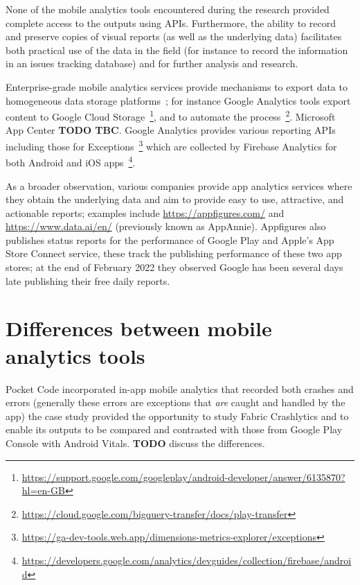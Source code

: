 None of the mobile analytics tools encountered during the research provided complete access to the outputs using APIs. Furthermore, the ability to record and preserve copies of visual reports (as well as the underlying data) facilitates both practical use of the data in the field (for instance to record the information in an issues tracking database) and for further analysis and research. 

Enterprise-grade mobile analytics services provide mechanisms to export data to homogeneous data storage platforms~\citep{androiddevelopers2015_integrate_play_data_into_your_workflow_with_data_exports}; for instance Google Analytics tools export content to Google Cloud Storage~\footnote{\url{https://support.google.com/googleplay/android-developer/answer/6135870?hl=en-GB}}, and to automate the process~\footnote{\url{https://cloud.google.com/bigquery-transfer/docs/play-transfer}}. Microsoft App Center \textbf{TODO TBC}. Google Analytics provides various reporting APIs including those for Exceptions~\footnote{\url{https://ga-dev-tools.web.app/dimensions-metrics-explorer/exceptions}} which are collected by Firebase Analytics for both Android and iOS apps~\footnote{\url{https://developers.google.com/analytics/devguides/collection/firebase/android}}. %

As a broader observation, various companies provide app analytics services where they obtain the underlying data %
and aim to provide easy to use, attractive, and actionable reports; examples include \url{https://appfigures.com/} and \url{https://www.data.ai/en/} (previously known as AppAnnie). Appfigures also publishes status reports for the performance of Google Play and Apple's App Store Connect service, these track the publishing performance of these two app stores; at the end of February 2022 they observed Google has been several days late publishing their free daily reports. %

\section{Differences between mobile analytics tools}
Pocket Code incorporated in-app mobile analytics that recorded both crashes and errors (generally these errors are exceptions that \textit{are} caught and handled by the app) the case study provided the opportunity to study Fabric Crashlytics and to enable its outputs to be compared and contrasted with those from Google Play Console with Android Vitals. \textbf{TODO} discuss the differences.


